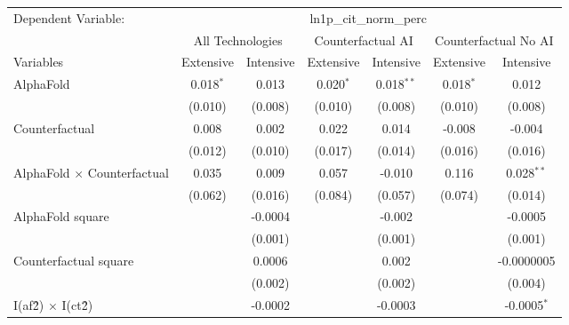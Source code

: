 \begingroup
\centering
\begin{tabular}{lcccccc}
   \tabularnewline \midrule \midrule
   Dependent Variable: & \multicolumn{6}{c}{ln1p\_cit\_norm\_perc}\\
 & \multicolumn{2}{c}{All Technologies} & \multicolumn{2}{c}{Counterfactual AI} & \multicolumn{2}{c}{Counterfactual No AI} \\
\cmidrule(lr){1-1}\cmidrule(lr){2-3} \cmidrule(lr){4-5} \cmidrule(lr){6-7}
Variables & \multicolumn{1}{c}{Extensive} & \multicolumn{1}{c}{Intensive} & \multicolumn{1}{c}{Extensive} & \multicolumn{1}{c}{Intensive} & \multicolumn{1}{c}{Extensive} & \multicolumn{1}{c}{Intensive} \\
\cmidrule(lr){1-1}\cmidrule(lr){2-2} \cmidrule(lr){3-3} \cmidrule(lr){4-4} \cmidrule(lr){5-5} \cmidrule(lr){6-6} \cmidrule(lr){7-7}
   AlphaFold                          & 0.018$^{*}$ & 0.013    & 0.020$^{*}$ & 0.018$^{**}$ & 0.018$^{*}$ & 0.012\\   
                                      & (0.010)     & (0.008)  & (0.010)     & (0.008)      & (0.010)     & (0.008)\\   
   Counterfactual                     & 0.008       & 0.002    & 0.022       & 0.014        & -0.008      & -0.004\\   
                                      & (0.012)     & (0.010)  & (0.017)     & (0.014)      & (0.016)     & (0.016)\\   
   AlphaFold $\times$ Counterfactual  & 0.035       & 0.009    & 0.057       & -0.010       & 0.116       & 0.028$^{**}$\\   
                                      & (0.062)     & (0.016)  & (0.084)     & (0.057)      & (0.074)     & (0.014)\\   
   AlphaFold square                   &             & -0.0004  &             & -0.002       &             & -0.0005\\   
                                      &             & (0.001)  &             & (0.001)      &             & (0.001)\\   
   Counterfactual square              &             & 0.0006   &             & 0.002        &             & -0.0000005\\   
                                      &             & (0.002)  &             & (0.002)      &             & (0.004)\\   
   I(af\^2) $\times$ I(ct\^2)         &             & -0.0002  &             & -0.0003      &             & -0.0005$^{*}$\\   

\end{tabular}
